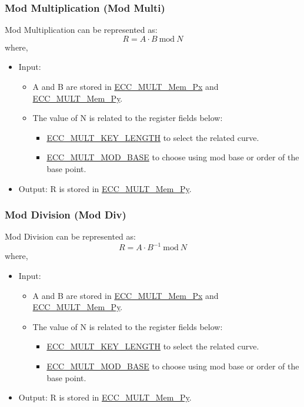 \documentclass[main\_\_EN.tex]{subfiles}
\begin{document}
\subsubsection{Mod Multiplication (Mod Multi)}
Mod Multiplication can be represented as:
\[
R = A \cdot B \ \textrm{mod}\ N
\]
where,
\begin{itemize}
    \item Input:
    \begin{itemize}
        \item A and B are stored in \hyperref[tab:ecc-memory]{ECC\_MULT\_Mem\_Px} and \hyperref[tab:ecc-memory]{ECC\_MULT\_Mem\_Py}.
        \item The value of N is related to the register fields below:
        \begin{itemize}
            \item \hyperref[fielddesc:ECCMULTKEYLENGTH]{ECC\_MULT\_KEY\_LENGTH} to select the related curve.
            \item \hyperref[fielddesc:ECCMULTMODBASE]{ECC\_MULT\_MOD\_BASE} to choose using mod base or order of the base point.
        \end{itemize}
    \end{itemize}
    \item Output: R is stored in \hyperref[tab:ecc-memory]{ECC\_MULT\_Mem\_Py}.
\end{itemize}

\subsubsection{Mod Division (Mod Div)}
Mod Division can be represented as:
\[
R = A \cdot {B}^{-1} \ \textrm{mod}\ N
\]
where,
\begin{itemize}
    \item Input:
    \begin{itemize}
        \item A and B are stored in \hyperref[tab:ecc-memory]{ECC\_MULT\_Mem\_Px} and \hyperref[tab:ecc-memory]{ECC\_MULT\_Mem\_Py}.
        \item The value of N is related to the register fields below:
        \begin{itemize}
            \item \hyperref[fielddesc:ECCMULTKEYLENGTH]{ECC\_MULT\_KEY\_LENGTH} to select the related curve.
            \item \hyperref[fielddesc:ECCMULTMODBASE]{ECC\_MULT\_MOD\_BASE} to choose using mod base or order of the base point.
        \end{itemize}
    \end{itemize}
    \item Output: R is stored in \hyperref[tab:ecc-memory]{ECC\_MULT\_Mem\_Py}.
\end{itemize}
\end{document}
